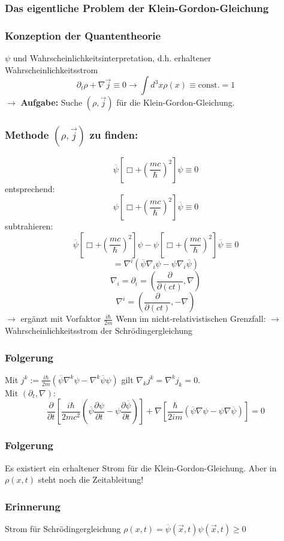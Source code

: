 \documentclass[twoside,a4paper]{scrartcl}
\renewcommand{\1}{\mathds{1}}
\newcommand{\ra}{\rightarrow}
\begin{document}
\subsubsection*{Das eigentliche Problem der Klein-Gordon-Gleichung}
\subsubsection*{Konzeption der Quantentheorie}
$\psi$ und Wahrscheinlichkeitsinterpretation, d.h. erhaltener Wahrscheinlichkeitsstrom 
$$\partial_t \rho+\nabla \vec j\equiv 0 \ra \int d^3x \rho(x)\equiv \mathrm{const.}=1$$
$\ra$ \textbf{Aufgabe:} Suche $(\rho,\vec j)$ für die Klein-Gordon-Gleichung.
\subsubsection*{Methode $(\rho,\vec j)$ zu finden:}
$$\overline{\psi}[\Box+(\frac{mc}{\hbar})^2]\psi\equiv0$$
entsprechend:
$${\psi}[\Box+(\frac{mc}{\hbar})^2]\overline{\psi}\equiv0$$
subtrahieren:
$$\overline{\psi}[\Box+(\frac{mc}{\hbar})^2]\psi-{\psi}[\Box+(\frac{mc}{\hbar})^2]\overline{\psi}\equiv 0$$
$$=\nabla^i(\overline{\psi}\nabla_i \psi-\psi\nabla_i \overline{\psi})$$
$$\nabla_i=\partial_i=(\frac{\partial}{\partial (ct)},\nabla)$$
$$\nabla^i=(\frac{\partial}{\partial (ct)},-\nabla)$$
$\ra$ ergänzt mit Vorfaktor $\frac{i\hbar}{2m}$
Wenn im nicht-relativistischen Grenzfall: $\ra$ Wahrscheinlichkeitsstrom der Schrödingergleichung

\subsubsection*{Folgerung}
Mit $j^k:=\frac{i\hbar}{2m}(\overline{\psi}\nabla^k\psi-\nabla^k \overline{\psi} \psi)$ gilt $\nabla_k j^k=\nabla^kj_k=0$.\\
Mit $(\partial_t,\nabla)$:
$$\frac{\partial}{\partial t}[\frac{i\hbar}{2mc^2}(\overline{\psi}\frac{\partial \psi}{\partial t}-\psi \frac{\partial \overline{\psi}}{\partial t})]+\nabla[\frac{\hbar}{2im}(\overline{\psi}\nabla \psi-\psi\nabla \overline{\psi})]=0$$
\subsubsection*{Folgerung}
Es existiert ein erhaltener Strom für die Klein-Gordon-Gleichung. Aber in $\rho(x,t)$ steht noch die Zeitableitung!
\subsubsection*{Erinnerung}
Strom für Schrödingergleichung $\rho(x,t)=\overline{\psi}(\vec x,t) \psi(\vec x,t)\geq 0$
\end{document}
